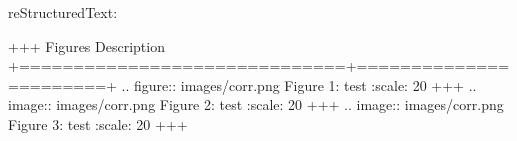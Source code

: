 \documentclass[letterpaper,11pt,english]{sphinxmanual}
\begin{document}
reStructuredText:

\begin{sphinxVerbatim}[commandchars=\\\{\}]
+\PYGZhy{}\PYGZhy{}\PYGZhy{}\PYGZhy{}\PYGZhy{}\PYGZhy{}\PYGZhy{}\PYGZhy{}\PYGZhy{}\PYGZhy{}\PYGZhy{}\PYGZhy{}\PYGZhy{}\PYGZhy{}\PYGZhy{}\PYGZhy{}\PYGZhy{}\PYGZhy{}\PYGZhy{}\PYGZhy{}\PYGZhy{}\PYGZhy{}\PYGZhy{}\PYGZhy{}\PYGZhy{}\PYGZhy{}\PYGZhy{}\PYGZhy{}\PYGZhy{}\PYGZhy{}+\PYGZhy{}\PYGZhy{}\PYGZhy{}\PYGZhy{}\PYGZhy{}\PYGZhy{}\PYGZhy{}\PYGZhy{}\PYGZhy{}\PYGZhy{}\PYGZhy{}\PYGZhy{}\PYGZhy{}\PYGZhy{}\PYGZhy{}\PYGZhy{}\PYGZhy{}\PYGZhy{}\PYGZhy{}\PYGZhy{}\PYGZhy{}\PYGZhy{}\PYGZhy{}+
 Figures                      \textbar{} Description           \textbar{}
+==============================+=======================+
 .. figure:: images/corr.png  \textbar{} Figure 1: test        \textbar{}
    :scale: 20 \PYGZpc{}              \textbar{}                       \textbar{}
+\PYGZhy{}\PYGZhy{}\PYGZhy{}\PYGZhy{}\PYGZhy{}\PYGZhy{}\PYGZhy{}\PYGZhy{}\PYGZhy{}\PYGZhy{}\PYGZhy{}\PYGZhy{}\PYGZhy{}\PYGZhy{}\PYGZhy{}\PYGZhy{}\PYGZhy{}\PYGZhy{}\PYGZhy{}\PYGZhy{}\PYGZhy{}\PYGZhy{}\PYGZhy{}\PYGZhy{}\PYGZhy{}\PYGZhy{}\PYGZhy{}\PYGZhy{}\PYGZhy{}\PYGZhy{}+\PYGZhy{}\PYGZhy{}\PYGZhy{}\PYGZhy{}\PYGZhy{}\PYGZhy{}\PYGZhy{}\PYGZhy{}\PYGZhy{}\PYGZhy{}\PYGZhy{}\PYGZhy{}\PYGZhy{}\PYGZhy{}\PYGZhy{}\PYGZhy{}\PYGZhy{}\PYGZhy{}\PYGZhy{}\PYGZhy{}\PYGZhy{}\PYGZhy{}\PYGZhy{}+
 .. image:: images/corr.png   \textbar{} Figure 2: test        \textbar{}
    :scale: 20 \PYGZpc{}              \textbar{}                       \textbar{}
+\PYGZhy{}\PYGZhy{}\PYGZhy{}\PYGZhy{}\PYGZhy{}\PYGZhy{}\PYGZhy{}\PYGZhy{}\PYGZhy{}\PYGZhy{}\PYGZhy{}\PYGZhy{}\PYGZhy{}\PYGZhy{}\PYGZhy{}\PYGZhy{}\PYGZhy{}\PYGZhy{}\PYGZhy{}\PYGZhy{}\PYGZhy{}\PYGZhy{}\PYGZhy{}\PYGZhy{}\PYGZhy{}\PYGZhy{}\PYGZhy{}\PYGZhy{}\PYGZhy{}\PYGZhy{}+\PYGZhy{}\PYGZhy{}\PYGZhy{}\PYGZhy{}\PYGZhy{}\PYGZhy{}\PYGZhy{}\PYGZhy{}\PYGZhy{}\PYGZhy{}\PYGZhy{}\PYGZhy{}\PYGZhy{}\PYGZhy{}\PYGZhy{}\PYGZhy{}\PYGZhy{}\PYGZhy{}\PYGZhy{}\PYGZhy{}\PYGZhy{}\PYGZhy{}\PYGZhy{}+
 .. image:: images/corr.png   \textbar{} Figure 3: test        \textbar{}
    :scale: 20 \PYGZpc{}              \textbar{}                       \textbar{}
+\PYGZhy{}\PYGZhy{}\PYGZhy{}\PYGZhy{}\PYGZhy{}\PYGZhy{}\PYGZhy{}\PYGZhy{}\PYGZhy{}\PYGZhy{}\PYGZhy{}\PYGZhy{}\PYGZhy{}\PYGZhy{}\PYGZhy{}\PYGZhy{}\PYGZhy{}\PYGZhy{}\PYGZhy{}\PYGZhy{}\PYGZhy{}\PYGZhy{}\PYGZhy{}\PYGZhy{}\PYGZhy{}\PYGZhy{}\PYGZhy{}\PYGZhy{}\PYGZhy{}\PYGZhy{}+\PYGZhy{}\PYGZhy{}\PYGZhy{}\PYGZhy{}\PYGZhy{}\PYGZhy{}\PYGZhy{}\PYGZhy{}\PYGZhy{}\PYGZhy{}\PYGZhy{}\PYGZhy{}\PYGZhy{}\PYGZhy{}\PYGZhy{}\PYGZhy{}\PYGZhy{}\PYGZhy{}\PYGZhy{}\PYGZhy{}\PYGZhy{}\PYGZhy{}\PYGZhy{}+
\end{sphinxVerbatim}
\end{document}
